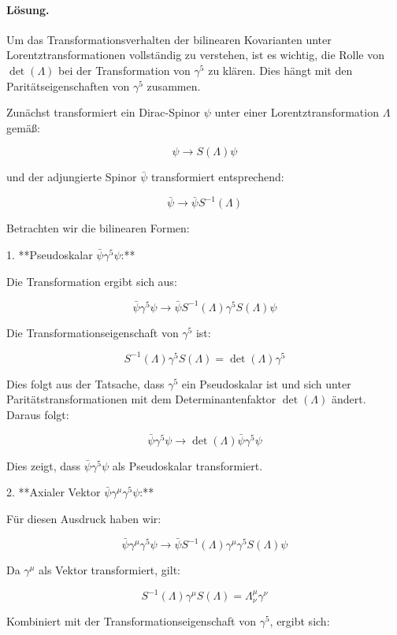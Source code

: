 \documentclass[11pt,a4paper]{article}
\begin{document}
\paragraph{Lösung.}
Um das Transformationsverhalten der bilinearen Kovarianten unter Lorentztransformationen vollständig zu verstehen, ist es wichtig, die Rolle von \(\operatorname{det}(\Lambda)\) bei der Transformation von \(\gamma^5\) zu klären. Dies hängt mit den Paritätseigenschaften von \(\gamma^5\) zusammen.

Zunächst transformiert ein Dirac-Spinor \(\psi\) unter einer Lorentztransformation \(\Lambda\) gemäß:

\[
\psi \rightarrow S(\Lambda) \psi
\]

und der adjungierte Spinor \(\bar{\psi}\) transformiert entsprechend:

\[
\bar{\psi} \rightarrow \bar{\psi} S^{-1}(\Lambda)
\]

Betrachten wir die bilinearen Formen:

1. **Pseudoskalar \(\bar{\psi} \gamma^5 \psi\):**

Die Transformation ergibt sich aus:

\[
\bar{\psi} \gamma^5 \psi \rightarrow \bar{\psi} S^{-1}(\Lambda) \gamma^5 S(\Lambda) \psi
\]

Die Transformationseigenschaft von \(\gamma^5\) ist:

\[
S^{-1}(\Lambda) \gamma^5 S(\Lambda) = \operatorname{det}(\Lambda) \gamma^5
\]

Dies folgt aus der Tatsache, dass \(\gamma^5\) ein Pseudoskalar ist und sich unter Paritätstransformationen mit dem Determinantenfaktor \(\operatorname{det}(\Lambda)\) ändert. Daraus folgt:

\[
\bar{\psi} \gamma^5 \psi \rightarrow \operatorname{det}(\Lambda) \bar{\psi} \gamma^5 \psi
\]

Dies zeigt, dass \(\bar{\psi} \gamma^5 \psi\) als Pseudoskalar transformiert.

2. **Axialer Vektor \(\bar{\psi} \gamma^\mu \gamma^5 \psi\):**

Für diesen Ausdruck haben wir:

\[
\bar{\psi} \gamma^\mu \gamma^5 \psi \rightarrow \bar{\psi} S^{-1}(\Lambda) \gamma^\mu \gamma^5 S(\Lambda) \psi
\]

Da \(\gamma^\mu\) als Vektor transformiert, gilt:

\[
S^{-1}(\Lambda) \gamma^\mu S(\Lambda) = \Lambda_\nu^\mu \gamma^\nu
\]

Kombiniert mit der Transformationseigenschaft von \(\gamma^5\), ergibt sich:
\end{document}

